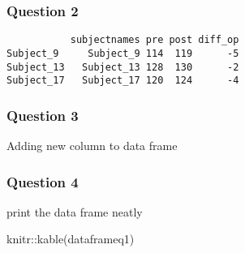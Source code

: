 \documentclass[
  letterpaper,
  DIV=11,
  numbers=noendperiod]{scrartcl}
\newenvironment{Shaded}{\begin{snugshade}}{\end{snugshade}}
\newcommand{\DecValTok}[1]{\textcolor[rgb]{0.68,0.00,0.00}{#1}}
\newcommand{\FunctionTok}[1]{\textcolor[rgb]{0.28,0.35,0.67}{#1}}
\newcommand{\NormalTok}[1]{\textcolor[rgb]{0.00,0.23,0.31}{#1}}
\newcommand{\OtherTok}[1]{\textcolor[rgb]{0.00,0.23,0.31}{#1}}
\newcommand{\SpecialCharTok}[1]{\textcolor[rgb]{0.37,0.37,0.37}{#1}}
\begin{document}
\subsubsection{Question 2}\label{question-2}

\begin{Shaded}
\end{Shaded}

\begin{verbatim}
           subjectnames pre post diff_op
Subject_9     Subject_9 114  119      -5
Subject_13   Subject_13 128  130      -2
Subject_17   Subject_17 120  124      -4
\end{verbatim}

\subsubsection{Question 3}\label{question-3-1}

Adding new column to data frame

\begin{Shaded}
\end{Shaded}

\subsubsection{Question 4}\label{question-4-1}

print the data frame neatly

\begin{Shaded}
\begin{Highlighting}[]
\NormalTok{knitr}\SpecialCharTok{::}\FunctionTok{kable}\NormalTok{(dataframeq1)}
\end{Highlighting}
\end{Shaded}
\end{document}
